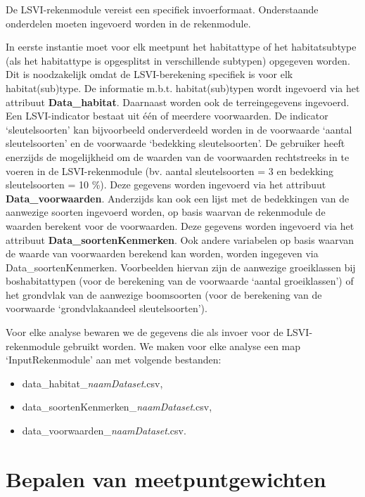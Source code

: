 \documentclass[twoside]{extreport}
\begin{document}
De LSVI-rekenmodule vereist een specifiek invoerformaat. Onderstaande
onderdelen moeten ingevoerd worden in de rekenmodule.

In eerste instantie moet voor elk meetpunt het habitattype of het
habitatsubtype (als het habitattype is opgesplitst in verschillende
subtypen) opgegeven worden. Dit is noodzakelijk omdat de LSVI-berekening
specifiek is voor elk habitat(sub)type. De informatie m.b.t.
habitat(sub)typen wordt ingevoerd via het attribuut
\textbf{Data\_habitat}. Daarnaast worden ook de terreingegevens
ingevoerd. Een LSVI-indicator bestaat uit één of meerdere voorwaarden.
De indicator `sleutelsoorten' kan bijvoorbeeld onderverdeeld worden in
de voorwaarde `aantal sleutelsoorten' en de voorwaarde `bedekking
sleutelsoorten'. De gebruiker heeft enerzijds de mogelijkheid om de
waarden van de voorwaarden rechtstreeks in te voeren in de
LSVI-rekenmodule (bv. aantal sleutelsoorten = 3 en bedekking
sleutelsoorten = 10 \%). Deze gegevens worden ingevoerd via het
attribuut \textbf{Data\_voorwaarden}. Anderzijds kan ook een lijst met
de bedekkingen van de aanwezige soorten ingevoerd worden, op basis
waarvan de rekenmodule de waarden berekent voor de voorwaarden. Deze
gegevens worden ingevoerd via het attribuut
\textbf{Data\_soortenKenmerken}. Ook andere variabelen op basis waarvan
de waarde van voorwaarden berekend kan worden, worden ingegeven via
Data\_soortenKenmerken. Voorbeelden hiervan zijn de aanwezige
groeiklassen bij boshabitattypen (voor de berekening van de voorwaarde
`aantal groeiklassen') of het grondvlak van de aanwezige boomsoorten
(voor de berekening van de voorwaarde `grondvlakaandeel
sleutelsoorten').

Voor elke analyse bewaren we de gegevens die als invoer voor de
LSVI-rekenmodule gebruikt worden. We maken voor elke analyse een map
`InputRekenmodule' aan met volgende bestanden:

\begin{itemize}
\tightlist
\item
  data\_habitat\_\emph{naamDataset}.csv,
\item
  data\_soortenKenmerken\_\emph{naamDataset}.csv,
\item
  data\_voorwaarden\_\emph{naamDataset}.csv.
\end{itemize}

\section{Bepalen van meetpuntgewichten}\label{h:meetpuntgewichten}
\end{document}
